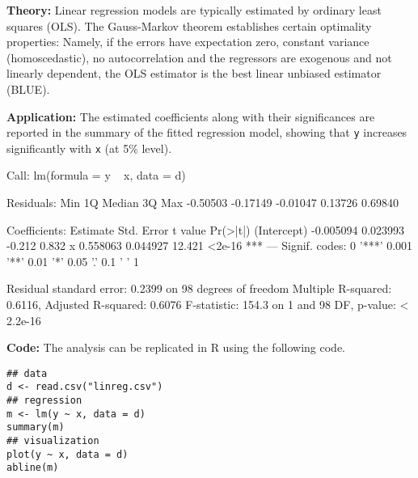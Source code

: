 \begin{solution}
\textbf{Theory:} Linear regression models are typically estimated by ordinary least squares (OLS).
The Gauss-Markov theorem establishes certain optimality properties: Namely, if the errors
have expectation zero, constant variance (homoscedastic), no autocorrelation and the
regressors are exogenous and not linearly dependent, the OLS estimator is the best linear
unbiased estimator (BLUE).

\textbf{Application:} The estimated coefficients along with their significances are reported in the
summary of the fitted regression model, showing that \texttt{y} increases significantly with \texttt{x} (at 5\% level).

\begin{Schunk}
\begin{Soutput}
Call:
lm(formula = y ~ x, data = d)

Residuals:
     Min       1Q   Median       3Q      Max 
-0.50503 -0.17149 -0.01047  0.13726  0.69840 

Coefficients:
             Estimate Std. Error t value Pr(>|t|)    
(Intercept) -0.005094   0.023993  -0.212    0.832    
x            0.558063   0.044927  12.421   <2e-16 ***
---
Signif. codes:  0 '***' 0.001 '**' 0.01 '*' 0.05 '.' 0.1 ' ' 1

Residual standard error: 0.2399 on 98 degrees of freedom
Multiple R-squared:  0.6116,	Adjusted R-squared:  0.6076 
F-statistic: 154.3 on 1 and 98 DF,  p-value: < 2.2e-16
\end{Soutput}
\end{Schunk}

\textbf{Code:} The analysis can be replicated in R using the following code.

\begin{verbatim}
## data
d <- read.csv("linreg.csv")
## regression
m <- lm(y ~ x, data = d)
summary(m)
## visualization
plot(y ~ x, data = d)
abline(m)
\end{verbatim}
\end{solution}


